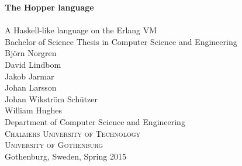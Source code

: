 
\begin{titlepage}
			
\addtolength{\voffset}{2cm}


\mbox{}
\vfill
\renewcommand{\familydefault}{\sfdefault} \normalfont %
\textbf{{\Huge	The Hopper language 	\\[0.2cm] 
				}} 	\\[0.5cm]
{\Large A Haskell-like language on the Erlang VM}\\[0.5cm]
Bachelor of Science Thesis in Computer Science and Engineering \\[0.5cm]

{\Large
{}
  Björn Norgren \\
  David Lindbom \\
  Jakob Jarmar   \\
  Johan Larsson \\
  Johan Wikström Schützer \\
  William Hughes }\\[2.0cm]


Department of Computer Science and Engineering \\
\textsc{Chalmers University of Technology} \\
\textsc{University of Gothenburg} \\
Gothenburg, Sweden, Spring 2015

\renewcommand{\familydefault}{\rmdefault} \normalfont %
\end{titlepage}


\newpage
\restoregeometry
\thispagestyle{empty}
\mbox{}


